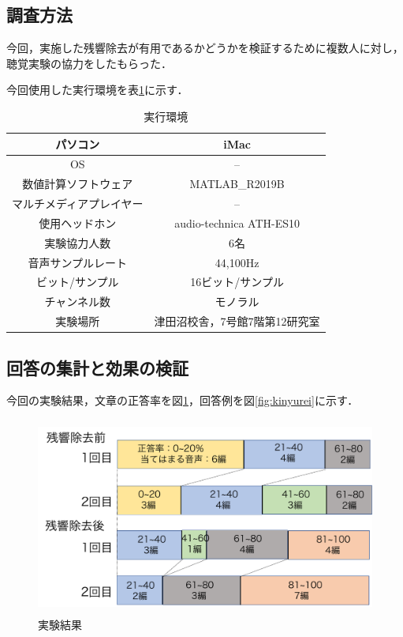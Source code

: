 \documentclass[a4j,11pt]{jsarticle}
\begin{document}
\newpage
\subsection{調査方法}
今回，実施した残響除去が有用であるかどうかを検証するために複数人に対し，聴覚実験の協力をしたもらった．

今回使用した実行環境を表\ref{tab:use}に示す．

\begin{table}[htb]
\caption{実行環境}
  \begin{tabular}{|c|c|} \hline
    パソコン & iMac  \\ \hline
    OS & --  \\ \hline
    数値計算ソフトウェア & MATLAB\_R2019B  \\ \hline
    マルチメディアプレイヤー & --  \\ \hline
    使用ヘッドホン & audio-technica ATH-ES10  \\ \hline
    実験協力人数 & 6名  \\ \hline
    音声サンプルレート & 44,100Hz  \\ \hline
    ビット/サンプル & 16ビット/サンプル  \\ \hline
    チャンネル数 & モノラル  \\ \hline
    実験場所 & 津田沼校舎，7号館7階第12研究室\\ \hline
  \end{tabular}
  \label{tab:use}
\end{table}
\subsection{回答の集計と効果の検証}
今回の実験結果，文章の正答率を図\ref{fig:shitsumonshi}，回答例を図\ref{fig:kinyurei}に示す．
\newpage
\begin{figure}[h]
\begin{center}
 \includegraphics[clip,width=130mm,height=65mm]{shitsumonkekka.pdf}
\end{center}
 \caption{実験結果}
 \label{fig:shitsumonshi}
\end{figure}
\end{document}

